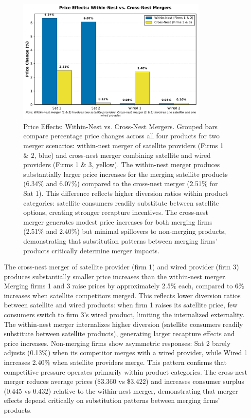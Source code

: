 \documentclass[english,11pt]{article}
\begin{document}
\begin{enumerate}
\begin{figure}[h]
\centering
\includegraphics[width=0.85\textwidth]{merger_comparison.pdf}
\caption{Price Effects: Within-Nest vs. Cross-Nest Mergers. Grouped bars compare percentage price changes across all four products for two merger scenarios: within-nest merger of satellite providers (Firms 1 \& 2, blue) and cross-nest merger combining satellite and wired providers (Firms 1 \& 3, yellow). The within-nest merger produces substantially larger price increases for the merging satellite products (6.34\% and 6.07\%) compared to the cross-nest merger (2.51\% for Sat 1). This difference reflects higher diversion ratios within product categories: satellite consumers readily substitute between satellite options, creating stronger recapture incentives. The cross-nest merger generates modest price increases for both merging firms (2.51\% and 2.40\%) but minimal spillovers to non-merging products, demonstrating that substitution patterns between merging firms' products critically determine merger impacts.}
\label{fig:merger_comparison}
\end{figure}

The cross-nest merger of satellite provider (firm 1) and wired provider (firm 3) produces substantially smaller price increases than the within-nest merger. Merging firms 1 and 3 raise prices by approximately 2.5\% each, compared to 6\% increases when satellite competitors merged. This reflects lower diversion ratios between satellite and wired products: when firm 1 raises its satellite price, few consumers switch to firm 3's wired product, limiting the internalized externality. The within-nest merger internalizes higher diversion (satellite consumers readily substitute between satellite products), generating larger recapture effects and price increases. Non-merging firms show asymmetric responses: Sat 2 barely adjusts (0.13\%) when its competitor merges with a wired provider, while Wired 1 increases 2.40\% when satellite providers merge. This pattern confirms that competitive pressure operates primarily within product categories. The cross-nest merger reduces average prices (\$3.360 vs \$3.422) and increases consumer surplus (0.445 vs 0.432) relative to the within-nest merger, demonstrating that merger effects depend critically on substitution patterns between merging firms' products.


\end{enumerate}
\end{document}
